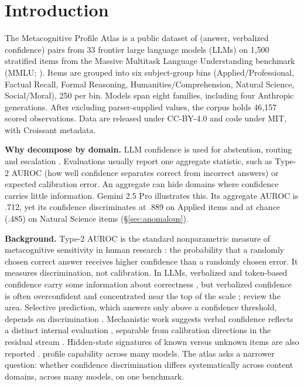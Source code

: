 \section{Introduction}

The Metacognitive Profile Atlas is a public dataset of (answer, verbalized confidence) pairs from 33 frontier large language models (LLMs) on 1{,}500 stratified items from the Massive Multitask Language Understanding benchmark (MMLU; \citealp{hendrycks2021mmlu}). Items are grouped into six subject-group bins (Applied/Professional, Factual Recall, Formal Reasoning, Humanities/Comprehension, Natural Science, Social/Moral), 250 per bin. Models span eight families, including four Anthropic generations. After excluding parser-supplied values, the corpus holds 46{,}157 scored observations. Data are released under CC-BY-4.0 and code under MIT, with Croissant metadata.

\textbf{Why decompose by domain.} LLM confidence is used for abstention, routing and escalation \citep{wen2025}. Evaluations usually report one aggregate statistic, such as Type-2 AUROC (how well confidence separates correct from incorrect answers) or expected calibration error. An aggregate can hide domains where confidence carries little information. Gemini 2.5 Pro illustrates this. Its aggregate AUROC is .712, yet its confidence discriminates at .889 on Applied items and at chance (.485) on Natural Science items (\S\ref{sec:anomalous}).

\textbf{Background.} Type-2 AUROC is the standard nonparametric measure of metacognitive sensitivity in human research \citep{fleming2014,maniscalco2012}: the probability that a randomly chosen correct answer receives higher confidence than a randomly chosen error. It measures discrimination, not calibration. In LLMs, verbalized and token-based confidence carry some information about correctness \citep{kadavath2022}, but verbalized confidence is often overconfident and concentrated near the top of the scale \citep{xiong2023,yang2024}; \citet{steyvers2025} review the area. Selective prediction, which answers only above a confidence threshold, depends on discrimination \citep{elyaniv2010,geifman2017}. Mechanistic work suggests verbal confidence reflects a distinct internal evaluation \citep{kumaran2026}, separable from calibration directions in the residual stream \citep{miao2026}. Hidden-state signatures of known versus unknown items are also reported \citep{kim2026}. \citet{haznitrama2026} profile capability across many models. The atlas asks a narrower question: whether confidence discrimination differs systematically across content domains, across many models, on one benchmark.

